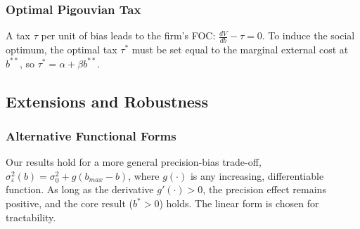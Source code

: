 \subsubsection{Optimal Pigouvian Tax}
A tax $\tau$ per unit of bias leads to the firm's FOC: $\frac{dV}{db} - \tau = 0$. To induce the social optimum, the optimal tax $\tau^*$ must be set equal to the marginal external cost at $b^{**}$, so $\tau^* = \alpha + \beta b^{**}$.

\subsection{Extensions and Robustness}

\subsubsection{Alternative Functional Forms}
Our results hold for a more general precision-bias trade-off, $\sigma_\varepsilon^2(b) = \sigma_0^2 + g(b_{max} - b)$, where $g(\cdot)$ is any increasing, differentiable function. As long as the derivative $g'(\cdot)>0$, the precision effect remains positive, and the core result ($b^*>0$) holds. The linear form is chosen for tractability.